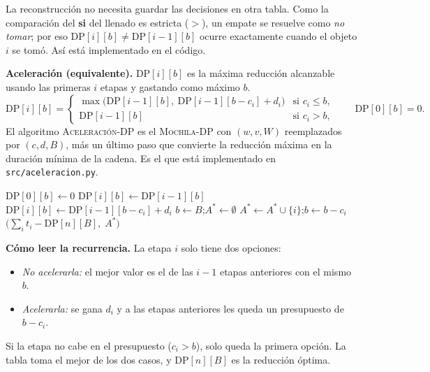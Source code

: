 \documentclass[11pt,a4paper]{article}
\newcommand{\DP}[2]{\mathrm{DP}[#1][#2]}
\theoremstyle{plano}
\begin{document}
La reconstrucción no necesita guardar las decisiones en otra tabla. Como la comparación del \textbf{si} del llenado es estricta ($>$), un empate se resuelve como \textit{no tomar}; por eso $\DP{i}{b}\ne\DP{i-1}{b}$ ocurre exactamente cuando el objeto $i$ se tomó. Así está implementado en el código.

\textbf{Aceleración (equivalente).} $\DP{i}{b}$ es la máxima reducción alcanzable usando las primeras $i$ etapas y gastando como máximo $b$.
\begin{equation}
  \DP{i}{b}=
  \begin{cases}
    \max\bigl(\DP{i-1}{b},\ \DP{i-1}{b-c_i}+d_i\bigr) & \text{si } c_i\le b,\\
    \DP{i-1}{b} & \text{si } c_i>b,
  \end{cases}
  \qquad \DP{0}{b}=0.
\end{equation}
El algoritmo \textsc{Aceleración-DP} es el \textsc{Mochila-DP} con $(w,v,W)$ reemplazados por $(c,d,B)$, más un último paso que convierte la reducción máxima en la duración mínima de la cadena. Es el que está implementado en \texttt{src/aceleracion.py}.

\begin{algorithm}[h]
\caption{\textsc{Aceleración-DP}$(t,c,d,B,n)$}
\begin{algorithmic}[1]
 \State $\DP{0}{b}\gets 0$ \EndFor
{}
    \State $\DP{i}{b}\gets\DP{i-1}{b}$
    \If{$c_i\le b$ \textbf{y} $\DP{i-1}{b-c_i}+d_i>\DP{i-1}{b}$}
      \State $\DP{i}{b}\gets\DP{i-1}{b-c_i}+d_i$
    \EndIf
  \EndFor
\EndFor
\State $b\gets B$;\quad $A^*\gets\emptyset$
  \If{$\DP{i}{b}\ne\DP{i-1}{b}$} \State $A^*\gets A^*\cup\{i\}$;\quad $b\gets b-c_i$ \EndIf
\EndFor
\State \Return $\bigl(\sum_i t_i-\DP{n}{B},\;A^*\bigr)$
\end{algorithmic}
\end{algorithm}

\textbf{Cómo leer la recurrencia.} La etapa $i$ solo tiene dos opciones:
\begin{itemize}
  \item \textit{No acelerarla:} el mejor valor es el de las $i-1$ etapas anteriores con el mismo $b$.
  \item \textit{Acelerarla:} se gana $d_i$ y a las etapas anteriores les queda un presupuesto de $b-c_i$.
\end{itemize}
Si la etapa no cabe en el presupuesto ($c_i>b$), solo queda la primera opción. La tabla toma el mejor de los dos casos, y $\DP{n}{B}$ es la reducción óptima.
\end{document}
